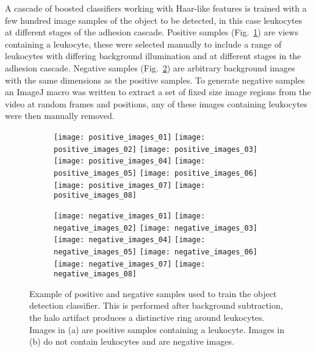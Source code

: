 A cascade of boosted classifiers working with Haar-like features is trained with a few hundred image samples of the object to be detected, in this case leukocytes at different stages of the adhesion cascade. Positive samples (Fig.~\ref{positive_images:a}) are views containing a leukocyte, these were selected manually to include a range of leukocytes with differing background illumination and at different stages in the adhesion cascade. Negative samples (Fig.~\ref{negative_images:b}) are arbitrary background images with the same dimensions as the positive samples. To generate negative samples an ImageJ macro was written to extract a set of fixed size image regions from the video at random frames and positions, any of these images containing leukocytes were then manually removed. 
\begin{figure}[htbp]{} 
	\begin{subfigure}[b]{\linewidth}
		\centering
		\texttt{[image: positive\_images\_01]} 
		\texttt{[image: positive\_images\_02]} 
		\texttt{[image: positive\_images\_03]} 
		\texttt{[image: positive\_images\_04]} 
		\texttt{[image: positive\_images\_05]} 
		\texttt{[image: positive\_images\_06]} 
		\texttt{[image: positive\_images\_07]} 
		\texttt{[image: positive\_images\_08]} 
		\caption{} 
		\label{positive_images:a} 
	\end{subfigure} 
	\begin{subfigure}[b]{\linewidth}
		\centering
		\texttt{[image: negative\_images\_01]} 
		\texttt{[image: negative\_images\_02]} 
		\texttt{[image: negative\_images\_03]} 
		\texttt{[image: negative\_images\_04]} 
		\texttt{[image: negative\_images\_05]} 
		\texttt{[image: negative\_images\_06]} 
		\texttt{[image: negative\_images\_07]} 
		\texttt{[image: negative\_images\_08]} 
		\caption{} 
		\label{negative_images:b} 
	\end{subfigure} 
\caption{Example of positive and negative samples used to train the object detection classifier. This is performed after background subtraction, the halo artifact produces a distinctive ring around leukocytes. Images in (a) are positive samples containing a leukocyte. Images in (b) do not contain leukocytes and are negative images.}
\label{positiveNegativeSamples} 
\end{figure}

